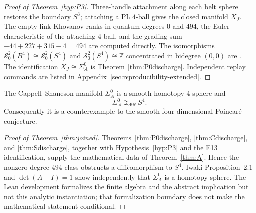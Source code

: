 \begin{proof}[Proof of Theorem~\ref{hyp:P3}]
Three-handle attachment along each belt sphere restores the boundary
$S^3$; attaching a PL $4$-ball gives the closed manifold $X_J$.  The empty-link Khovanov ranks in quantum degrees $0$ and $494$, the
Euler characteristic of the attaching $4$-ball, and the grading sum
$-44+227+315-4=494$ are computed directly.  The isomorphisms
$\mathcal S^2_0(B^4)\cong\mathcal S^2_0(S^4)$ and
$\mathcal S^2_0(S^4)\cong\mathbb Z$ concentrated in bidegree $(0,0)$ are
\cite[Proposition~3.4 and Corollary~3.5]{ManolescuWalkerWedrich2023}.
The identification $X_J\cong\Sigma_A^0$ is Theorem~\ref{thm:P0discharge}.
Independent replay commands are listed in
Appendix~\ref{sec:reproducibility-extended}.
\end{proof}

\begin{theorem}\label{thm:joined}
The Cappell--Shaneson manifold $\Sigma_A^0$ is a smooth homotopy $4$-sphere
and
\[
\Sigma_A^0\not\cong_{\mathrm{diff}}S^4.
\]
Consequently it is a counterexample to the smooth four-dimensional
Poincar\'e conjecture.
\end{theorem}

\begin{proof}[Proof of Theorem~\ref{thm:joined}]
Theorems~\ref{thm:P0discharge}, \ref{thm:Cdischarge}, and
\ref{thm:Sdischarge}, together with Hypothesis~\ref{hyp:P3} and the E13
identification, supply the mathematical data of Theorem~\ref{thm:A}.  Hence
the nonzero degree-$494$ class obstructs a diffeomorphism to $S^4$.
Iwaki Proposition~2.1 and $\det(A-I)=1$ show independently that
$\Sigma_A^0$ is a homotopy sphere.  The Lean development formalizes the
finite algebra and the abstract implication but not this analytic
instantiation; that formalization boundary does not make the mathematical
statement conditional.
\end{proof}



